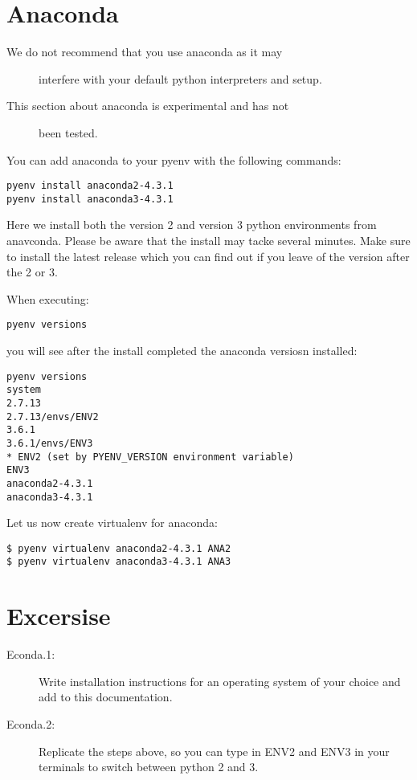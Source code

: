 \section{Anaconda}\label{anaconda}

\begin{description}
\item[We do not recommend that you use anaconda as it may]
interfere with your default python interpreters and setup.
\end{description}

\begin{description}
\item[This section about anaconda is experimental and has not]
been tested.
\end{description}

You can add anaconda to your pyenv with the following commands:

\begin{verbatim}
pyenv install anaconda2-4.3.1
pyenv install anaconda3-4.3.1
\end{verbatim}

Here we install both the version 2 and version 3 python environments
from anavconda. Please be aware that the install may tacke several
minutes. Make sure to install the latest release which you can find out
if you leave of the version after the 2 or 3.

When executing:

\begin{verbatim}
pyenv versions
\end{verbatim}

you will see after the install completed the anaconda versiosn
installed:

\begin{verbatim}
pyenv versions
system
2.7.13
2.7.13/envs/ENV2
3.6.1
3.6.1/envs/ENV3
* ENV2 (set by PYENV_VERSION environment variable)
ENV3
anaconda2-4.3.1
anaconda3-4.3.1
\end{verbatim}

Let us now create virtualenv for anaconda:

\begin{verbatim}
$ pyenv virtualenv anaconda2-4.3.1 ANA2
$ pyenv virtualenv anaconda3-4.3.1 ANA3
\end{verbatim}

\section{Excersise}\label{excersise}

\begin{description}
\item[Econda.1:]
Write installation instructions for an operating system of your choice
and add to this documentation.
\item[Econda.2:]
Replicate the steps above, so you can type in ENV2 and ENV3 in your
terminals to switch between python 2 and 3.
\end{description}
